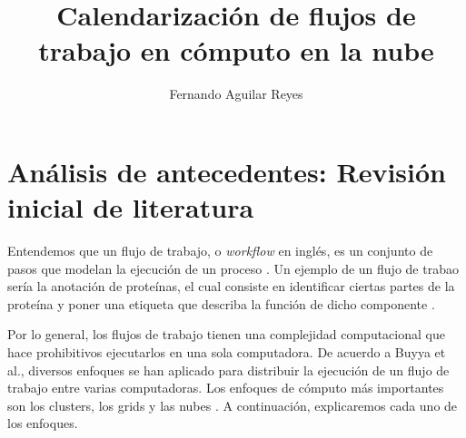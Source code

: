 \documentclass{article}
\title{Calendarización de flujos de trabajo en cómputo en la nube}
\author{Fernando Aguilar Reyes}
\begin{document}
\maketitle

\section{Análisis de antecedentes: Revisión inicial de literatura}

Entendemos que un flujo de trabajo, o \emph{workflow} en inglés, es un conjunto de pasos que modelan la ejecución de un proceso \cite{gutierrez2012agent}. Un ejemplo de un flujo de trabao sería la anotación de proteínas, el cual consiste en identificar ciertas partes de la proteína y poner una etiqueta que describa la función de dicho componente \cite{o2004mapping}. 

Por lo general, los flujos de trabajo tienen una complejidad computacional que hace prohibitivos ejecutarlos en una sola computadora. De acuerdo a Buyya et al., diversos enfoques se han aplicado para distribuir la ejecución de un flujo de trabajo entre varias computadoras. Los enfoques de cómputo más importantes son los clusters, los grids y las nubes \cite{buyya2009cloud}. A continuación, explicaremos cada uno de los enfoques.
\end{document}
